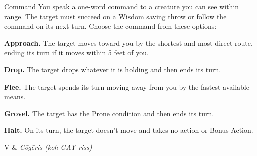 \begin{Spell}[
    level=1st,
    time=1 Action,
    range=60 ft,
    components={V},
    duration=Instantaneous,
    school=Enchantment,
    attack=WIS,
    effect=Prone
]{Command}
You speak a one-word command to a creature you can see within range. The target must succeed on a Wisdom saving throw or follow the command on its next turn. Choose the command from these options:

\textbf{Approach.} The target moves toward you by the shortest and most direct route, ending its turn if it moves within 5 feet of you.

\textbf{Drop.} The target drops whatever it is holding and then ends its turn.

\textbf{Flee.} The target spends its turn moving away from you by the fastest available means.

\textbf{Grovel.} The target has the Prone condition and then ends its turn.

\textbf{Halt.} On its turn, the target doesn't move and takes no action or Bonus Action.

\begin{components}
V & \textit{C\=og\=eris (koh-GAY-riss)}
\end{components}
\end{Spell}


